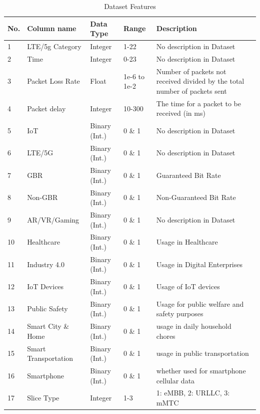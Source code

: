 \documentclass[conference]{IEEEtran}
\begin{document}
\begin{table}
    \centering
    \scriptsize
    \caption{Dataset Features}
    \begin{tabular}{p{0.15cm}|p{1.7cm}|p{1.25cm}|p{0.7cm}|p{4.1cm}}
        No. & Column name  & Data Type & Range & Description \\
        \hline
        1 & LTE/5g Category & Integer & 1-22 & No description in Dataset\\
        2 & Time & Integer & 0-23 & No description in Dataset\\
        3 & Packet Loss Rate & Float & 1e-6 to 1e-2 & Number of packets not received divided by the total number of packets sent \\
        4 & Packet delay & Integer & 10-300 & The time for a packet to be received (in ms) \\
        5 & IoT & Binary (Int.) & 0 \& 1 & No description in Dataset\\
        6 & LTE/5G & Binary (Int.) & 0 \& 1 & No description in Dataset\\
        7 & GBR & Binary (Int.) & 0 \& 1 & Guaranteed Bit Rate\\
        8 & Non-GBR & Binary (Int.) & 0 \& 1 & Non-Guaranteed Bit Rate\\
        9 & AR/VR/Gaming & Binary (Int.) & 0 \& 1 & No description in Dataset\\
        10 & Healthcare & Binary (Int.) & 0 \& 1 & Usage in Healthcare\\
        11 & Industry 4.0 & Binary (Int.) & 0 \& 1 & Usage in Digital Enterprises\\
        12 & IoT Devices & Binary (Int.) & 0 \& 1 & Usage of IoT devices\\
        13 & Public Safety & Binary (Int.) & 0 \& 1 & Usage for public welfare and safety purposes\\
        14 & Smart City \& Home & Binary (Int.) & 0 \& 1 & usage in daily household chores\\
        15 & Smart Transportation & Binary (Int.) & 0 \& 1 & usage in public transportation\\
        16 & Smartphone & Binary (Int.) & 0 \& 1 & whether used for smartphone cellular data\\
        \hline
        17 & Slice Type & Integer & 1-3 & 1: eMBB, 2: URLLC, 3: mMTC\\
    \end{tabular}
    \label{tab:features}
    \vspace{-5mm}
\end{table}
\end{document}
